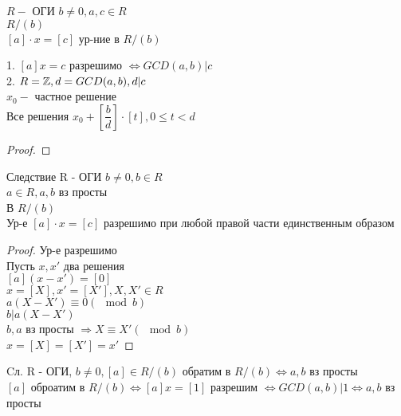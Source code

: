 $ R - $ ОГИ $ b \neq 0, a,c \in R $ \\
$ R / (b) $ \\
$ [a] \cdot x = [c] $ ур-ние в $ R/(b) $ \\
\begin{theorem}
	1. $ [a]x = c $ разрешимо $ \Leftrightarrow GCD(a,b) | c $ \\
	2. $ R = \mathbb{Z}, d = GCD(a, b), d | c $ \\
	$ x_0 - $ частное решение \\
	Все решения $ x_0 + \left[\dfrac{b}{d}\right] \cdot [t], 0 \leq t < d$\\
	\begin{proof}
	\end{proof}
\end{theorem}
Следствие R - ОГИ $ b \neq 0, b \in R $ \\
$ a \in R, a, b $ вз просты \\
В $ R / (b) $ \\
Ур-е $ [a] \cdot x = [c] $ разрешимо при любой правой части единственным образом \\
\begin{proof}
	Ур-е разрешимо \\
	Пусть $ x, x'$ два решения \\
	$ [a] (x - x') = [0] $ \\
	$ x  = [X], x' = [X'], X, X' \in R $ \\
	$ a (X - X') \equiv 0 (\mod b) $ \\
	$ b | a(X - X') $ \\
	$b, a $ вз просты $ \Rightarrow X \equiv X' (\mod b) $ \\
	$ x = [X] = [X'] = x' $
\end{proof} 
Cл. R - ОГИ, $b \neq 0,  [a] \in R / (b) $ обратим в  $ R/(b) \Leftrightarrow a,b $ вз просты \\
$ [a] $ оброатим в $ R/(b) \Leftrightarrow [a]x = [1] $ разрешим $ \Leftrightarrow GCD(a,b) | 1 \Leftrightarrow a, b $ вз просты \\
